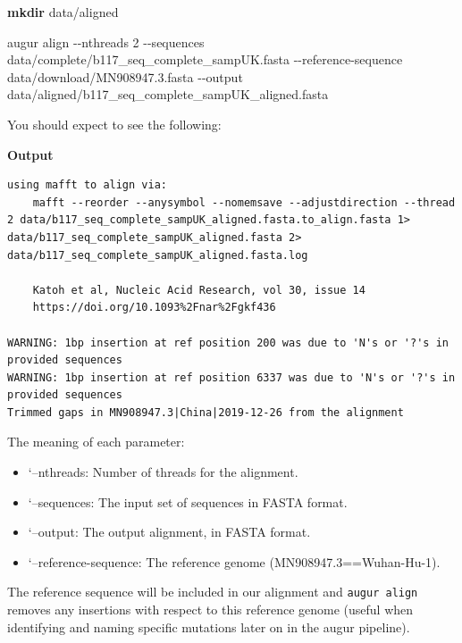 \documentclass[
]{book}
\newenvironment{Shaded}{\begin{snugshade}}{\end{snugshade}}
\newcommand{\AttributeTok}[1]{\textcolor[rgb]{0.13,0.29,0.53}{#1}}
\newcommand{\ExtensionTok}[1]{#1}
\newcommand{\FunctionTok}[1]{\textcolor[rgb]{0.13,0.29,0.53}{\textbf{#1}}}
\newcommand{\NormalTok}[1]{#1}
\providecommand{\tightlist}{%
  \setlength{\itemsep}{0pt}\setlength{\parskip}{0pt}}
\begin{document}
\begin{Shaded}
\begin{Highlighting}[]
\FunctionTok{mkdir}\NormalTok{ data/aligned}

\ExtensionTok{augur}\NormalTok{ align }\AttributeTok{{-}{-}nthreads}\NormalTok{ 2 }\AttributeTok{{-}{-}sequences}\NormalTok{ data/complete/b117\_seq\_complete\_sampUK.fasta }\AttributeTok{{-}{-}reference{-}sequence}\NormalTok{ data/download/MN908947.3.fasta }\AttributeTok{{-}{-}output}\NormalTok{ data/aligned/b117\_seq\_complete\_sampUK\_aligned.fasta}
\end{Highlighting}
\end{Shaded}

You should expect to see the following:

\textbf{Output}

\begin{verbatim}
using mafft to align via:
    mafft --reorder --anysymbol --nomemsave --adjustdirection --thread 2 data/b117_seq_complete_sampUK_aligned.fasta.to_align.fasta 1> data/b117_seq_complete_sampUK_aligned.fasta 2> data/b117_seq_complete_sampUK_aligned.fasta.log 

    Katoh et al, Nucleic Acid Research, vol 30, issue 14
    https://doi.org/10.1093%2Fnar%2Fgkf436

WARNING: 1bp insertion at ref position 200 was due to 'N's or '?'s in provided sequences
WARNING: 1bp insertion at ref position 6337 was due to 'N's or '?'s in provided sequences
Trimmed gaps in MN908947.3|China|2019-12-26 from the alignment
\end{verbatim}

The meaning of each parameter:

\begin{itemize}
\tightlist
\item
  `--nthreads: Number of threads for the alignment.
\item
  `--sequences: The input set of sequences in FASTA format.
\item
  `--output: The output alignment, in FASTA format.
\item
  `--reference-sequence: The reference genome (MN908947.3==Wuhan-Hu-1).
\end{itemize}

The reference sequence will be included in our alignment and \texttt{augur\ align} removes any insertions with respect to this reference genome (useful when identifying and naming specific mutations later on in the augur pipeline).
\end{document}

